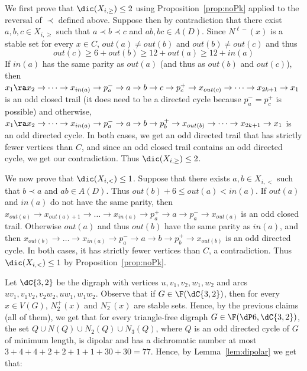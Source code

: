 \begin{subproof}
We first prove that $\dic(X_{i,\geq}) \leq 2$ using Proposition~\ref{prop:noPk} applied to the reversal of $\prec$ defined above. Suppose then by contradiction that there exist $a,b,c \in X_{i,\geq}$ such that $a \prec b \prec c$ and $ab, bc \in A(D)$. Since $N^{\ell -}(x)$ is a stable set for every $x \in C$, $out(a)\neq out(b)$ and $out(b) \neq out(c)$ and thus
$$out(c) \geq 6 + out(b) \geq 12 +out(a) \geq 12 + in(a)$$
If $in(a)$ has the same parity as $out(a)$ (and thus as $out(b)$ and $out(c)$), then 
$x_{1} \ra x_2   \rightarrow \dots \rightarrow x_{in(a)} \rightarrow p^{-}_{a} \rightarrow a \rightarrow b \rightarrow c \rightarrow p^{+}_{c} \rightarrow x_{out(c)} \rightarrow \dots \rightarrow x_{2k+1} \rightarrow x_{1}$ 
is an odd  closed trail (it does need to be a directed cycle because $p^-_a = p^+_c$ is possible)  and otherwise, 
$x_{1} \ra x_2  \rightarrow \dots \rightarrow x_{in(a)} \rightarrow p^{-}_{a} \rightarrow a \rightarrow b \rightarrow p^{+}_{b} \rightarrow x_{out(b)} \rightarrow \dots \rightarrow x_{2k+1} \rightarrow x_{1}$ 
is an odd directed cycle. In both cases, we get an odd directed trail that has strictly fewer vertices than $C$, and since an odd  closed trail contains an odd directed cycle, we get our contradiction. Thus $\dic(X_{i,\geq}) \leq 2$.

We now prove that $\dic(X_{i,<})\leq 1$. 
Suppose that there exists $a,b \in X_{i,<}$ such that $b \prec a$ and $ab \in A(D)$. 
Thus $out(b)+6 \leq out(a) < in(a) $. 
If $out(a)$ and $in(a)$ do not have the same parity, 
then $x_{out(a)} \rightarrow  x_{out(a)+1} \rightarrow \dots \rightarrow x_{in(a)} \rightarrow p^+_a \rightarrow a \rightarrow p^-_a \rightarrow x_{out(a)}$ is an odd  closed trail.  
Otherwise $out(a)$ and thus $out(b)$ have the same parity as $in(a)$, and then $x_{out(b)} \rightarrow  \dots \rightarrow x_{in(a)} \rightarrow p^-_a \rightarrow a \rightarrow b \rightarrow p^+_b \rightarrow x_{out(b)} $ is an odd directed cycle.  
In both cases, it has strictly fewer vertices than $C$, a contradiction.  
Thus $\dic(X_{i,<}) \leq 1$ by Proposition~\ref{prop:noPk}. 
\end{subproof}


Let $\dC{3,2}$ be the digraph with vertices $u,v_1, v_2, w_1, w_2$ and arcs $uv_1, v_1v_2, v_2w_2, uw_1, w_1w_2$. Observe that if $G \in \F(\dC{3,2})$, then for every $x \in V(G)$, $N^{+}_2(x)$ and $N^{-}_2(x)$ are stable sets. Hence, by the previous claims (all of them), we get that for every triangle-free digraph $G \in \F(\dP6, \dC{3,2})$,
the set $Q \cup N(Q) \cup N_{2}(Q) \cup N_{3}(Q)$, where $Q$ is an odd directed cycle of $G$ of minimum length, is dipolar and has a dichromatic number at most $3 + 4 + 4+ 2 + 2 +1 + 1 + 30 + 30=77$. Hence, by Lemma~\ref{lem:dipolar} we get that:

